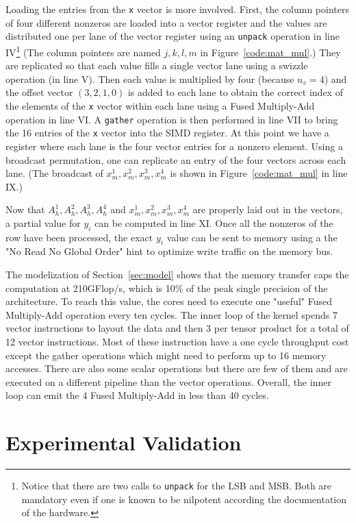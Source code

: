 \documentclass{sig-alternate}
\def\ee#1{{#1}}
\begin{document}
Loading the entries from the {\tt x} vector is  more
involved. First, the column pointers of four different nonzeros are
loaded into a vector register and the values are distributed one per
lane of the vector register using an {\tt unpack}
operation in line IV\footnote{Notice that there are two calls to {\tt unpack} for the
LSB and MSB. Both are mandatory even if one is known to be
nilpotent according the documentation of the hardware.} (The column
pointers are named $j,k,l,m$ in Figure~\ref{code:mat_mul}.) They
are replicated so that each value fills a single vector lane 
using a swizzle operation (in line V). Then each value is multiplied by four
(because $n_v=4$) 
and the offset vector $(3,2,1,0)$ is added to each lane to obtain the
correct index of the elements of the {\tt x} vector within each lane
using a Fused Multiply-Add operation in line VI. A {\tt gather} operation is then
performed in line VII to bring the 16 entries of the {\tt x} vector into the SIMD
register. At this point we have a register where each lane is the
four vector entries for a nonzero element. Using a broadcast
permutation, one can replicate an entry of the four vectors across
each lane. (The broadcast of $x_m^1,x_m^2,x_m^3,x_m^4$ is shown in
Figure~\ref{code:mat_mul} in line IX.)

Now that $A_h^1,A_h^2,A_h^3,A_h^4$ and $x_m^1,x_m^2,x_m^3,x_m^4$ are
properly laid out in the vectors, a partial value for $y_i$ can be
computed in line XI. Once all the nonzeros of the row have been processed, the
exact $y_i$ value can be sent to memory using a the "No Read No Global
Order" hint to optimize write traffic on the memory bus.

\ee{The modelization of Section~\ref{sec:model} shows that the memory
  transfer caps the computation at 210GFlop/s, which is 10\% of the
  peak single precision of the architecture. To reach this value, the
  cores need to execute one "useful" Fused Multiply-Add operation
  every ten cycles. The inner loop of the kernel spends 7 vector
  instructions to layout the data and then 3 per tensor product for a
  total of 12 vector instructions. Most of these instruction have a
  one cycle throughput cost except the gather operations which might
  need to perform up to 16 memory accesses. There are also some scalar
  operations but there are few of them and are executed on a different
  pipeline than the vector operations. Overall, the inner loop can
  emit the 4 Fused Multiply-Add in less than 40 cycles.}

\section{Experimental Validation}
\label{sec:expe}
\end{document}
